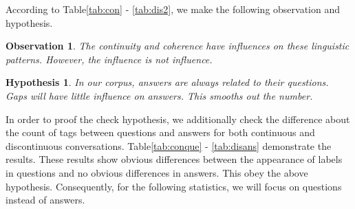 \documentclass[bsc,frontabs,twoside,singlespacing,parskip,deptreport]{infthesis}     %
\newtheorem*{observation}{Observation}
\newtheorem*{hypo}{Hypothesis}
\begin{document}
According to Table\ref{tab:con} - \ref{tab:dis2}, we make the following observation and hypothesis.

\begin{observation}
The continuity and coherence have influences on these linguistic patterns. However, the influence is not influence.
\end{observation} 

\begin{hypo}
In our corpus, answers are always related to their questions. Gaps will have little influence on answers. This smooths out the number.
\end{hypo}



In order to proof the check hypothesis, we additionally check the difference about the count of tags between questions and answers for both continuous and discontinuous conversations. Table\ref{tab:conque} - \ref{tab:disans} demonstrate the results. These results show obvious differences between the appearance of labels in questions and no obvious differences in answers. This obey the above hypothesis. Consequently, for the following statistics, we will focus on questions instead of answers.
\end{document}
